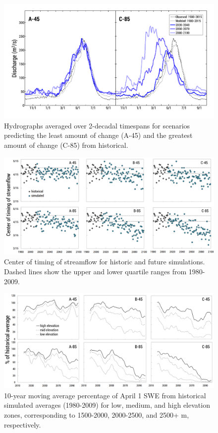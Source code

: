 \documentclass[11pt,letterpaper]{article}
\begin{document}
\begin{figure}
\centering
\includegraphics[width=\textwidth]{figure-files/figure10.png}
\caption{Hydrographs averaged over 2-decadal timespans for scenarios predicting the least amount of change (A-45) and the greatest amount of change (C-85) from historical.}
\label{fig:HydrographDecadeAvg}
\end{figure}
\clearpage

\begin{figure}
\centering
\includegraphics[width=\textwidth]{figure-files/figure11.png}
\caption{Center of timing of streamflow for historic and future simulations. Dashed lines show the upper and lower quartile ranges from 1980-2009. }
\label{fig:CenterOfTiming}
\end{figure}
\clearpage

\begin{figure}
\centering
\includegraphics[width=\textwidth]{figure-files/figure12.png}
\caption{10-year moving average percentage of April 1 SWE from historical simulated averages (1980-2009) for low, medium, and high elevation zones, corresponding to 1500-2000, 2000-2500, and 2500+ m, respectively.}
\label{fig:PercentApril1SWE}
\end{figure}
\clearpage
\end{document}
